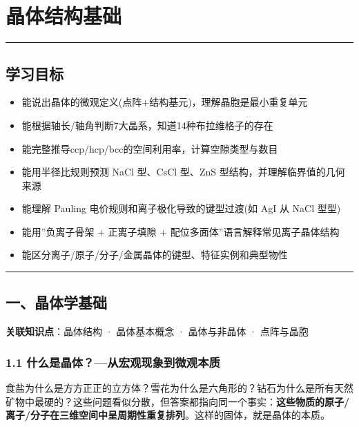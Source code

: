 \section{晶体结构基础}\label{ux6676ux4f53ux7ed3ux6784ux57faux7840}

\begin{center}\rule{0.5\linewidth}{0.5pt}\end{center}

\subsection{学习目标}\label{ux5b66ux4e60ux76eeux6807}

\begin{itemize}
\tightlist
\item
  能说出晶体的微观定义(点阵+结构基元)，理解晶胞是最小重复单元
\item
  能根据轴长/轴角判断7大晶系，知道14种布拉维格子的存在
\item
  能完整推导ccp/hcp/bcc的空间利用率，计算空隙类型与数目
\item
  能用半径比规则预测 NaCl 型、CsCl 型、ZnS 型结构，并理解临界值的几何来源
\item
  能理解 Pauling 电价规则和离子极化导致的键型过渡(如 AgI 从 NaCl 型 型)
\item
  能用''负离子骨架 + 正离子填隙 + 配位多面体''语言解释常见离子晶体结构
\item
  能区分离子/原子/分子/金属晶体的键型、特征实例和典型物性
\end{itemize}

\begin{center}\rule{0.5\linewidth}{0.5pt}\end{center}

\subsection{一、晶体学基础}\label{ux4e00ux6676ux4f53ux5b66ux57faux7840}

\textbf{关联知识点}：晶体结构 · 晶体基本概念 · 晶体与非晶体 · 点阵与晶胞

\subsubsection{1.1 什么是晶体？---从宏观现象到微观本质}\label{ux4ec0ux4e48ux662fux6676ux4f53ux4eceux5b8fux89c2ux73b0ux8c61ux5230ux5faeux89c2ux672cux8d28}

食盐为什么是方方正正的立方体？雪花为什么是六角形的？钻石为什么是所有天然矿物中最硬的？这些问题看似分散，但答案都指向同一个事实：\textbf{这些物质的原子/离子/分子在三维空间中呈周期性重复排列}。这样的固体，就是晶体的本质。

